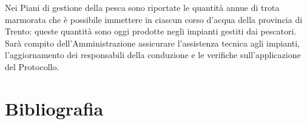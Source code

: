 \documentclass[10pt,twoside,openany,x11names,svgnames,italian,a5paper,dvipsnames,table]{memoir}
\newcommand\chapterillustration{}
\begin{document}
Nei Piani di gestione della pesca sono riportate le quantità annue di trota marmorata che è possibile immettere in ciascun corso d’acqua della provincia di Trento: queste quantità sono oggi prodotte negli impianti gestiti dai pescatori. Sarà compito dell’Amministrazione assicurare l’assistenza tecnica agli impianti, l’aggiornamento dei responsabili della conduzione e le verifiche sull’applicazione del Protocollo.


  
\setlength\afterchapskip{10mm}
\chapter{Bibliografia}
\renewcommand\chapterillustration{}
\renewcommand*{\bibname}{}
\end{document}
